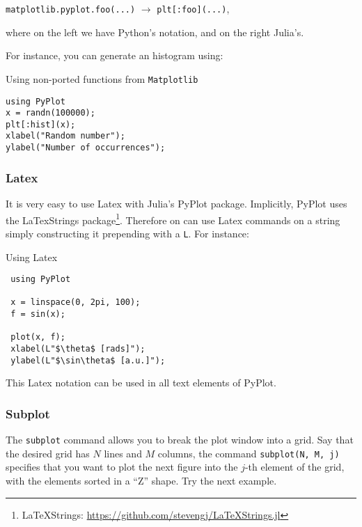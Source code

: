 \begin{center}
 \texttt{matplotlib.pyplot.foo(...)} $\longrightarrow$ \texttt{plt[:foo](...)},
\end{center} 
where on the left we have Python's notation, and on the right Julia's.

For instance, you can generate an histogram using:

\begin{example}{Using non-ported functions from \texttt{Matplotlib}}
\begin{verbatim}
using PyPlot
x = randn(100000);
plt[:hist](x);
xlabel("Random number");
ylabel("Number of occurrences");
\end{verbatim}
\end{example}

\subsubsection{Latex}

It is very easy to use Latex with Julia's PyPlot package. Implicitly, PyPlot uses the LaTexStrings package\footnote{LaTeXStrings: \url{https://github.com/stevengj/LaTeXStrings.jl}}. Therefore on can use Latex commands on a string simply constructing it prepending with a \texttt{L}. For instance:

\begin{example}{Using Latex}
\begin{verbatim}
 using PyPlot
 
 x = linspace(0, 2pi, 100);
 f = sin(x);
 
 plot(x, f);
 xlabel(L"$\theta$ [rads]");
 ylabel(L"$\sin\theta$ [a.u.]");
\end{verbatim}
\end{example}

This Latex notation can be used in all text elements of PyPlot.

\subsubsection{Subplot}

The \texttt{subplot} command allows you to break the plot window into a grid. Say that the desired grid has $N$ lines and $M$ columns, the command \texttt{subplot(N, M, j)} specifies that you want to plot the next figure into the $j$-th element of the grid, with the elements sorted in a ``Z'' shape. Try the next example.

